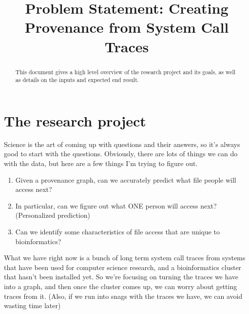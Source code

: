 \documentclass{article}
\title{Problem Statement: Creating Provenance from System Call Traces}
\begin{document}
\maketitle

\begin{abstract}
This document gives a high level overview of the research project and its goals, as well as details on the inputs and expected end result.
\end{abstract}

\section{The research project}
Science is the art of coming up with questions and their answers, so it's always good to start with the questions. Obviously, there are lots of things we can do with the data, but here are a few things I'm trying to figure out.
\begin{enumerate}
\item Given a provenance graph, can we accurately predict what file people will access next?
\item In particular, can we figure out what ONE person will access next? (Personalized prediction)
\item Can we identify some characteristics of file access that are unique to bioinformatics?
\end{enumerate}

What we have right now is a bunch of long term system call traces from systems that have been used for computer science research, and a bioinformatics cluster that hasn't been installed yet. So we're focusing on turning the traces we have into a graph, and then once the cluster comes up, we can worry about getting traces from it. (Also, if we run into snags with the traces we have, we can avoid wasting time later)
\end{document}
